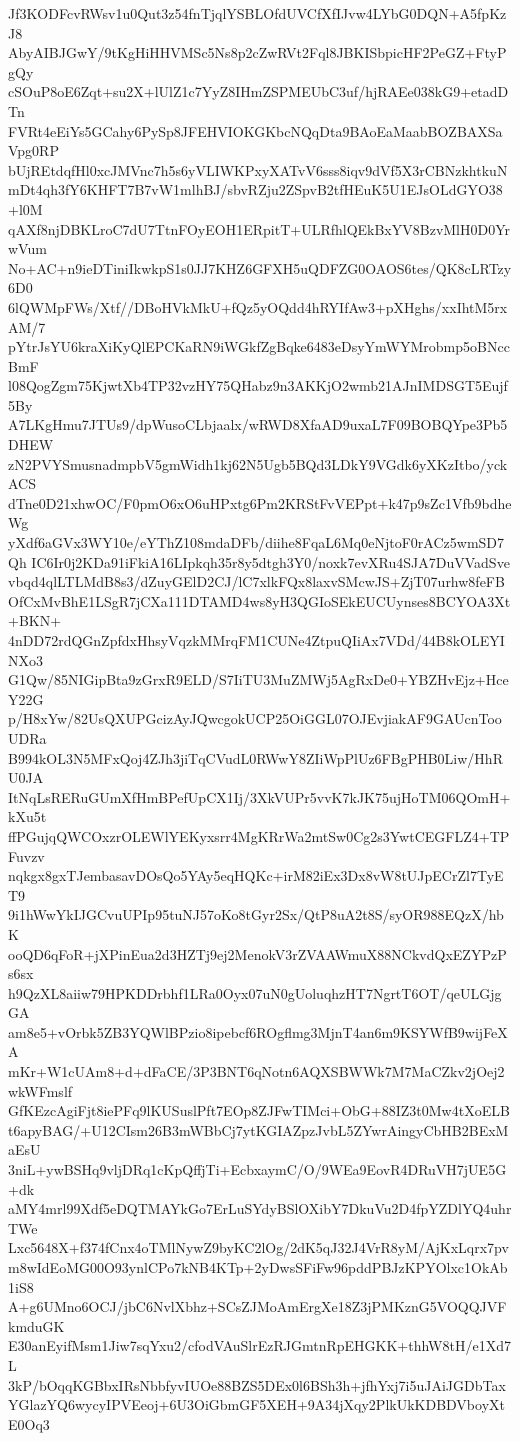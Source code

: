 Jf3KODFcvRWsv1u0Qut3z54fnTjqlYSBLOfdUVCfXfIJvw4LYbG0DQN+A5fpKzJ8
AbyAIBJGwY/9tKgHiHHVMSc5Ns8p2cZwRVt2Fql8JBKISbpicHF2PeGZ+FtyPgQy
cSOuP8oE6Zqt+su2X+lUlZ1c7YyZ8IHmZSPMEUbC3uf/hjRAEe038kG9+etadDTn
FVRt4eEiYs5GCahy6PySp8JFEHVIOKGKbcNQqDta9BAoEaMaabBOZBAXSaVpg0RP
bUjREtdqfHl0xcJMVnc7h5s6yVLIWKPxyXATvV6sss8iqv9dVf5X3rCBNzkhtkuN
mDt4qh3fY6KHFT7B7vW1mlhBJ/sbvRZju2ZSpvB2tfHEuK5U1EJsOLdGYO38+l0M
qAXf8njDBKLroC7dU7TtnFOyEOH1ERpitT+ULRfhlQEkBxYV8BzvMlH0D0YrwVum
No+AC+n9ieDTiniIkwkpS1s0JJ7KHZ6GFXH5uQDFZG0OAOS6tes/QK8cLRTzy6D0
6lQWMpFWs/Xtf//DBoHVkMkU+fQz5yOQdd4hRYIfAw3+pXHghs/xxIhtM5rxAM/7
pYtrJsYU6kraXiKyQlEPCKaRN9iWGkfZgBqke6483eDsyYmWYMrobmp5oBNccBmF
l08QogZgm75KjwtXb4TP32vzHY75QHabz9n3AKKjO2wmb21AJnIMDSGT5Eujf5By
A7LKgHmu7JTUs9/dpWusoCLbjaalx/wRWD8XfaAD9uxaL7F09BOBQYpe3Pb5DHEW
zN2PVYSmusnadmpbV5gmWidh1kj62N5Ugb5BQd3LDkY9VGdk6yXKzItbo/yckACS
dTne0D21xhwOC/F0pmO6xO6uHPxtg6Pm2KRStFvVEPpt+k47p9sZc1Vfb9bdheWg
yXdf6aGVx3WY10e/eYThZ108mdaDFb/diihe8FqaL6Mq0eNjtoF0rACz5wmSD7Qh
IC6Ir0j2KDa91iFkiA16LIpkqh35r8y5dtgh3Y0/noxk7evXRu4SJA7DuVVadSve
vbqd4qlLTLMdB8s3/dZuyGElD2CJ/lC7xlkFQx8laxvSMcwJS+ZjT07urhw8feFB
OfCxMvBhE1LSgR7jCXa111DTAMD4ws8yH3QGIoSEkEUCUynses8BCYOA3Xt+BKN+
4nDD72rdQGnZpfdxHhsyVqzkMMrqFM1CUNe4ZtpuQIiAx7VDd/44B8kOLEYINXo3
G1Qw/85NIGipBta9zGrxR9ELD/S7IiTU3MuZMWj5AgRxDe0+YBZHvEjz+HceY22G
p/H8xYw/82UsQXUPGcizAyJQwcgokUCP25OiGGL07OJEvjiakAF9GAUcnTooUDRa
B994kOL3N5MFxQoj4ZJh3jiTqCVudL0RWwY8ZIiWpPlUz6FBgPHB0Liw/HhRU0JA
ItNqLsRERuGUmXfHmBPefUpCX1Ij/3XkVUPr5vvK7kJK75ujHoTM06QOmH+kXu5t
ffPGujqQWCOxzrOLEWlYEKyxsrr4MgKRrWa2mtSw0Cg2s3YwtCEGFLZ4+TPFuvzv
nqkgx8gxTJembasavDOsQo5YAy5eqHQKc+irM82iEx3Dx8vW8tUJpECrZl7TyET9
9i1hWwYkIJGCvuUPIp95tuNJ57oKo8tGyr2Sx/QtP8uA2t8S/syOR988EQzX/hbK
ooQD6qFoR+jXPinEua2d3HZTj9ej2MenokV3rZVAAWmuX88NCkvdQxEZYPzPs6sx
h9QzXL8aiiw79HPKDDrbhf1LRa0Oyx07uN0gUoluqhzHT7NgrtT6OT/qeULGjgGA
am8e5+vOrbk5ZB3YQWlBPzio8ipebcf6ROgflmg3MjnT4an6m9KSYWfB9wijFeXA
mKr+W1cUAm8+d+dFaCE/3P3BNT6qNotn6AQXSBWWk7M7MaCZkv2jOej2wkWFmslf
GfKEzcAgiFjt8iePFq9lKUSuslPft7EOp8ZJFwTIMci+ObG+88IZ3t0Mw4tXoELB
t6apyBAG/+U12CIsm26B3mWBbCj7ytKGIAZpzJvbL5ZYwrAingyCbHB2BExMaEsU
3niL+ywBSHq9vljDRq1cKpQffjTi+EcbxaymC/O/9WEa9EovR4DRuVH7jUE5G+dk
aMY4mrl99Xdf5eDQTMAYkGo7ErLuSYdyBSlOXibY7DkuVu2D4fpYZDlYQ4uhrTWe
Lxc5648X+f374fCnx4oTMlNywZ9byKC2lOg/2dK5qJ32J4VrR8yM/AjKxLqrx7pv
m8wIdEoMG00O93ynlCPo7kNB4KTp+2yDwsSFiFw96pddPBJzKPYOlxc1OkAb1iS8
A+g6UMno6OCJ/jbC6NvlXbhz+SCsZJMoAmErgXe18Z3jPMKznG5VOQQJVFkmduGK
E30anEyifMsm1Jiw7sqYxu2/cfodVAuSlrEzRJGmtnRpEHGKK+thhW8tH/e1Xd7L
3kP/bOqqKGBbxIRsNbbfyvIUOe88BZS5DEx0l6BSh3h+jfhYxj7i5uJAiJGDbTax
YGlazYQ6wycyIPVEeoj+6U3OiGbmGF5XEH+9A34jXqy2PlkUkKDBDVboyXtE0Oq3
